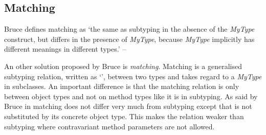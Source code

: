 %
%

\subsection{Matching}
\begin{prop}[Matching]
	\label{prop:matching}
	Bruce defines matching as `the same as subtyping in the absence
	of the \emph{MyType} construct, but differs in the presence of
	\emph{MyType}, because \emph{MyType} implicitly has different
	meanings in different types.' -- \cite{bruce_foundations_2002}
\end{prop}

An other solution proposed by Bruce \cite{bruce_binary_1995} is
\emph{matching}. Matching is a generalised subtyping relation, written
as `\match', between two types and takes regard to a \emph{MyType} in
subclasses. An important difference is that the matching relation is only
between object types and not on method types like it is in subtyping. As
said by Bruce in \cite{bruce_foundations_2002} matching does not differ
very much from subtyping except that \mytype is not substituted by its
concrete object type. This makes the relation weaker than subtyping
where contravariant method parameters are not allowed.

\begin{defn}[Matching]
	\label{defn:matching}
\end{defn}

